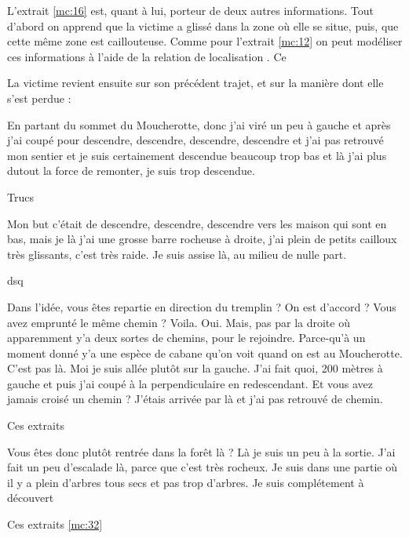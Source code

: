 L'extrait \ref{mc:16} est, quant à lui, porteur de deux autres
informations. Tout d'abord on apprend que la victime a glissé dans la
zone où elle se situe, puis, que cette même zone est
caillouteuse.
%
Comme pour l'extrait \ref{mc:12} on peut modéliser ces
informations à l'aide de la relation de localisation
. Ce 


La victime revient ensuite sur son précédent trajet, et sur la manière
dont elle s'est perdue :
%
\begin{dialogue*}
  \Req {} En partant du sommet du Moucherotte, donc j’ai
  viré un peu à gauche et  après j'ai coupé pour
   descendre, descendre, descendre, descendre et
   j’ai pas retrouvé mon sentier et 
  je suis certainement descendue beaucoup trop bas et là
   j’ai plus dutout la force de remonter, je suis trop
  descendue.
\end{dialogue*}
% 
Trucs

\begin{dialogue*}
  \Req {} Mon but c’était de descendre, descendre,
  descendre vers les maison qui sont en bas,  mais je
  là j’ai une grosse barre rocheuse à droite,  j’ai
  plein de petits cailloux très glissants,  c’est très
  raide.  Je suis assise là, au milieu de nulle part.
\end{dialogue*}
% 
dsq

\begin{dialogue*}
  \Sec {} Dans l’idée, vous êtes repartie en direction
  du tremplin ? On est d’accord ? Vous avez emprunté le même chemin ?
  \Req {} Voila. Oui.  Mais, pas par la
  droite où  apparemment y’a deux sortes de chemins,
  pour le rejoindre.  Parce-qu’à un moment donné y’a
  une espèce de cabane qu’on voit quand on est au Moucherotte. C’est
  pas là.  Moi je suis allée plutôt sur la
  gauche. J’ai fait quoi, 200 mètres à gauche et  puis
  j’ai coupé à la perpendiculaire en redescendant.
  \Sec {} Et vous avez jamais croisé un chemin ?
  \Req {} J’étais arrivée par là et j’ai pas retrouvé de
  chemin.
\end{dialogue*}
% 
Ces extraits

\begin{dialogue*}
  \Sec {} Vous êtes donc plutôt rentrée dans la forêt là ?
  \Req {} Là je suis un peu à la
  sortie.  J’ai fait un peu d’escalade là,
   parce que c’est très rocheux.  Je
  suis dans une partie où il y a plein d’arbres tous secs et pas trop
  d’arbres. Je suis complétement à découvert
\end{dialogue*}
% 
Ces extraits \ref{mc:32}



